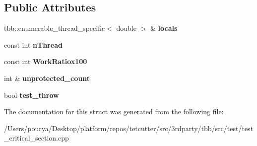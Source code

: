 \subsection*{Public Attributes}
\begin{DoxyCompactItemize}
\item 
\hypertarget{structBusyBody_a09230d168ab7d489f5574193a23231b4}{}tbb\+::enumerable\+\_\+thread\+\_\+specific$<$ double $>$ \& {\bfseries locals}\label{structBusyBody_a09230d168ab7d489f5574193a23231b4}

\item 
\hypertarget{structBusyBody_a24d261aafa94f15bf41e3f363f3bd4c9}{}const int {\bfseries n\+Thread}\label{structBusyBody_a24d261aafa94f15bf41e3f363f3bd4c9}

\item 
\hypertarget{structBusyBody_aa21bad85b476b4deeac25fb521451a90}{}const int {\bfseries Work\+Ratiox100}\label{structBusyBody_aa21bad85b476b4deeac25fb521451a90}

\item 
\hypertarget{structBusyBody_ad08fba2185d678d3c6046620cb815c82}{}int \& {\bfseries unprotected\+\_\+count}\label{structBusyBody_ad08fba2185d678d3c6046620cb815c82}

\item 
\hypertarget{structBusyBody_afca842ae1dd20aa47899b9b3b39c354f}{}bool {\bfseries test\+\_\+throw}\label{structBusyBody_afca842ae1dd20aa47899b9b3b39c354f}

\end{DoxyCompactItemize}


The documentation for this struct was generated from the following file\+:\begin{DoxyCompactItemize}
\item 
/\+Users/pourya/\+Desktop/platform/repos/tetcutter/src/3rdparty/tbb/src/test/test\+\_\+critical\+\_\+section.\+cpp\end{DoxyCompactItemize}
